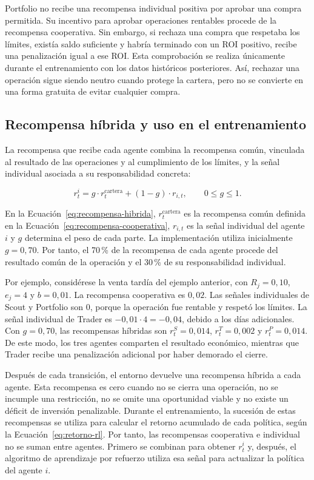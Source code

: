 Portfolio no recibe una recompensa individual positiva por aprobar una compra permitida. Su incentivo para aprobar operaciones rentables procede de la recompensa cooperativa. Sin embargo, si rechaza una compra que respetaba los límites, existía saldo suficiente y habría terminado con un ROI positivo, recibe una penalización igual a ese ROI. Esta comprobación se realiza únicamente durante el entrenamiento con los datos históricos posteriores. Así, rechazar una operación sigue siendo neutro cuando protege la cartera, pero no se convierte en una forma gratuita de evitar cualquier compra.

\subsection{Recompensa híbrida y uso en el entrenamiento}
\label{sec:recompensa-hibrida-entrenamiento}

La recompensa que recibe cada agente combina la recompensa común, vinculada al resultado de las operaciones y al cumplimiento de los límites, y la señal individual asociada a su responsabilidad concreta:

\begin{equation}
r_t^i=g\cdot r_t^{\mathrm{cartera}}+(1-g)\cdot r_{i,t},
\qquad 0\leq g\leq1.
\label{eq:recompensa-hibrida}
\end{equation}

En la Ecuación~\ref{eq:recompensa-hibrida}, $r_t^{\mathrm{cartera}}$ es la recompensa común definida en la Ecuación~\ref{eq:recompensa-cooperativa}, $r_{i,t}$ es la señal individual del agente $i$ y $g$ determina el peso de cada parte. La implementación utiliza inicialmente $g=0{,}70$. Por tanto, el 70\,\% de la recompensa de cada agente procede del resultado común de la operación y el 30\,\% de su responsabilidad individual.

Por ejemplo, considérese la venta tardía del ejemplo anterior, con $R_j=0{,}10$, $e_j=4$ y $b=0{,}01$. La recompensa cooperativa es $0{,}02$. Las señales individuales de Scout y Portfolio son $0$, porque la operación fue rentable y respetó los límites. La señal individual de Trader es $-0{,}01\cdot4=-0{,}04$, debido a los días adicionales. Con $g=0{,}70$, las recompensas híbridas son $r_t^S=0{,}014$, $r_t^T=0{,}002$ y $r_t^P=0{,}014$. De este modo, los tres agentes comparten el resultado económico, mientras que Trader recibe una penalización adicional por haber demorado el cierre.

Después de cada transición, el entorno devuelve una recompensa híbrida a cada agente. Esta recompensa es cero cuando no se cierra una operación, no se incumple una restricción, no se omite una oportunidad viable y no existe un déficit de inversión penalizable. Durante el entrenamiento, la sucesión de estas recompensas se utiliza para calcular el retorno acumulado de cada política, según la Ecuación~\ref{eq:retorno-rl}. Por tanto, las recompensas cooperativa e individual no se suman entre agentes. Primero se combinan para obtener $r_t^i$ y, después, el algoritmo de aprendizaje por refuerzo utiliza esa señal para actualizar la política del agente $i$.

